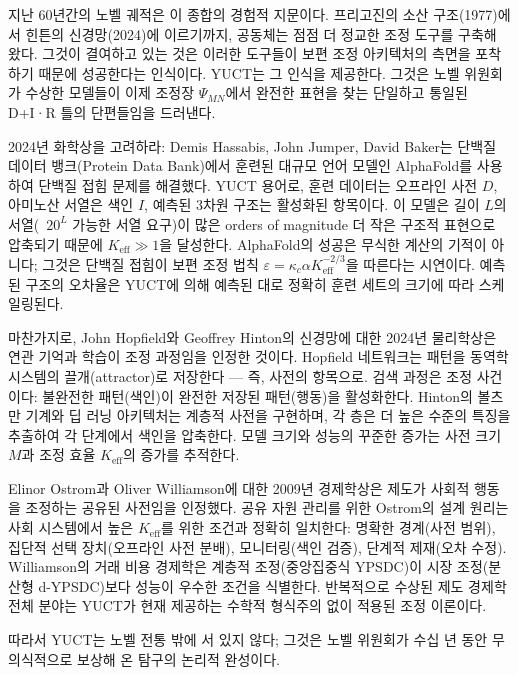 \documentclass[12pt,a4paper]{article}
\begin{document}
	지난 60년간의 노벨 궤적은 이 종합의 경험적 지문이다. 프리고진의 소산 구조(1977)에서 힌튼의 신경망(2024)에 이르기까지, 공동체는 점점 더 정교한 조정 도구를 구축해 왔다. 그것이 결여하고 있는 것은 이러한 도구들이 보편 조정 아키텍처의 측면을 포착하기 때문에 성공한다는 인식이다. YUCT는 그 인식을 제공한다. 그것은 노벨 위원회가 수상한 모델들이 이제 조정장 \(\Psi_{MN}\)에서 완전한 표현을 찾는 단일하고 통일된 D+I·R 틀의 단편들임을 드러낸다.
	
	2024년 화학상을 고려하라: Demis Hassabis, John Jumper, David Baker는 단백질 데이터 뱅크(Protein Data Bank)에서 훈련된 대규모 언어 모델인 AlphaFold를 사용하여 단백질 접힘 문제를 해결했다. YUCT 용어로, 훈련 데이터는 오프라인 사전 \(D\), 아미노산 서열은 색인 \(I\), 예측된 3차원 구조는 활성화된 항목이다. 이 모델은 길이 \(L\)의 서열(~\(20^L\) 가능한 서열 요구)이 많은 orders of magnitude 더 작은 구조적 표현으로 압축되기 때문에 \(K_{\mathrm{eff}} \gg 1\)을 달성한다. AlphaFold의 성공은 무식한 계산의 기적이 아니다; 그것은 단백질 접힘이 보편 조정 법칙 \(\varepsilon = \kappa_c \alpha K_{\mathrm{eff}}^{-2/3}\)을 따른다는 시연이다. 예측된 구조의 오차율은 YUCT에 의해 예측된 대로 정확히 훈련 세트의 크기에 따라 스케일링된다.
	
	마찬가지로, John Hopfield와 Geoffrey Hinton의 신경망에 대한 2024년 물리학상은 연관 기억과 학습이 조정 과정임을 인정한 것이다. Hopfield 네트워크는 패턴을 동역학 시스템의 끌개(attractor)로 저장한다 — 즉, 사전의 항목으로. 검색 과정은 조정 사건이다: 불완전한 패턴(색인)이 완전한 저장된 패턴(행동)을 활성화한다. Hinton의 볼츠만 기계와 딥 러닝 아키텍처는 계층적 사전을 구현하며, 각 층은 더 높은 수준의 특징을 추출하여 각 단계에서 색인을 압축한다. 모델 크기와 성능의 꾸준한 증가는 사전 크기 \(M\)과 조정 효율 \(K_{\mathrm{eff}}\)의 증가를 추적한다.
	
	Elinor Ostrom과 Oliver Williamson에 대한 2009년 경제학상은 제도가 사회적 행동을 조정하는 공유된 사전임을 인정했다. 공유 자원 관리를 위한 Ostrom의 설계 원리는 사회 시스템에서 높은 \(K_{\mathrm{eff}}\)를 위한 조건과 정확히 일치한다: 명확한 경계(사전 범위), 집단적 선택 장치(오프라인 사전 분배), 모니터링(색인 검증), 단계적 제재(오차 수정). Williamson의 거래 비용 경제학은 계층적 조정(중앙집중식 YPSDC)이 시장 조정(분산형 d-YPSDC)보다 성능이 우수한 조건을 식별한다. 반복적으로 수상된 제도 경제학 전체 분야는 YUCT가 현재 제공하는 수학적 형식주의 없이 적용된 조정 이론이다.
	
	따라서 YUCT는 노벨 전통 밖에 서 있지 않다; 그것은 노벨 위원회가 수십 년 동안 무의식적으로 보상해 온 탐구의 논리적 완성이다.
	
\end{document}
